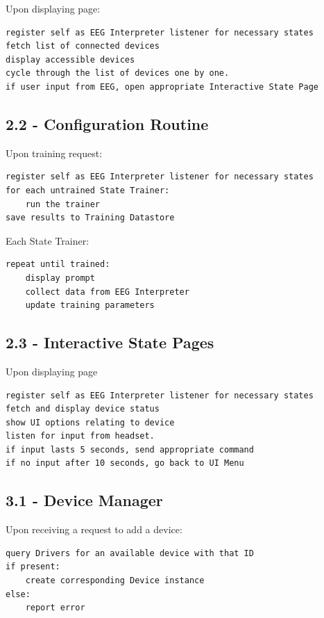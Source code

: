 \documentclass{article}
\begin{document}
Upon displaying page:
\begin{lstlisting}
register self as EEG Interpreter listener for necessary states
fetch list of connected devices
display accessible devices
cycle through the list of devices one by one.
if user input from EEG, open appropriate Interactive State Page
\end{lstlisting}

\subsection*{2.2 - Configuration Routine}

Upon training request:

\begin{lstlisting}
register self as EEG Interpreter listener for necessary states
for each untrained State Trainer:
    run the trainer
save results to Training Datastore
\end{lstlisting}

Each State Trainer:

\begin{lstlisting}
repeat until trained:
    display prompt
    collect data from EEG Interpreter
    update training parameters
\end{lstlisting}

\subsection*{2.3 - Interactive State Pages}

Upon displaying page

\begin{lstlisting}
register self as EEG Interpreter listener for necessary states
fetch and display device status
show UI options relating to device
listen for input from headset.
if input lasts 5 seconds, send appropriate command
if no input after 10 seconds, go back to UI Menu
\end{lstlisting}

\subsection*{3.1 - Device Manager}

Upon receiving a request to add a device:

\begin{lstlisting}
query Drivers for an available device with that ID
if present:
    create corresponding Device instance
else:
    report error
\end{lstlisting}
\end{document}
